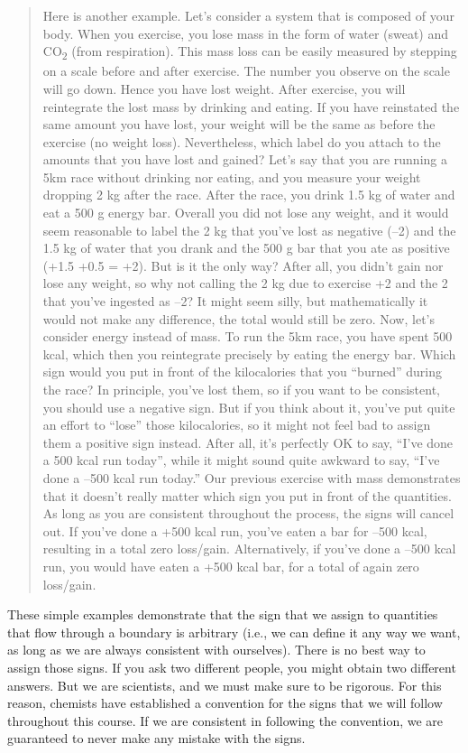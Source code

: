\documentclass[
]{book}
\theoremstyle{definition}
\theoremstyle{definition}
\theoremstyle{definition}
\theoremstyle{remark}
\begin{document}
\begin{quote}
Here is another example. Let's consider a system that is composed of your body. When you exercise, you lose mass in the form of water (sweat) and CO\textsubscript{2} (from respiration). This mass loss can be easily measured by stepping on a scale before and after exercise. The number you observe on the scale will go down. Hence you have lost weight. After exercise, you will reintegrate the lost mass by drinking and eating. If you have reinstated the same amount you have lost, your weight will be the same as before the exercise (no weight loss). Nevertheless, which label do you attach to the amounts that you have lost and gained? Let's say that you are running a 5km race without drinking nor eating, and you measure your weight dropping 2 kg after the race. After the race, you drink 1.5 kg of water and eat a 500 g energy bar. Overall you did not lose any weight, and it would seem reasonable to label the 2 kg that you've lost as negative (--2) and the 1.5 kg of water that you drank and the 500 g bar that you ate as positive (+1.5 +0.5 = +2). But is it the only way? After all, you didn't gain nor lose any weight, so why not calling the 2 kg due to exercise +2 and the 2 that you've ingested as --2? It might seem silly, but mathematically it would not make any difference, the total would still be zero. Now, let's consider energy instead of mass. To run the 5km race, you have spent 500 kcal, which then you reintegrate precisely by eating the energy bar. Which sign would you put in front of the kilocalories that you ``burned'' during the race? In principle, you've lost them, so if you want to be consistent, you should use a negative sign. But if you think about it, you've put quite an effort to ``lose'' those kilocalories, so it might not feel bad to assign them a positive sign instead. After all, it's perfectly OK to say, ``I've done a 500 kcal run today'', while it might sound quite awkward to say, ``I've done a --500 kcal run today.'' Our previous exercise with mass demonstrates that it doesn't really matter which sign you put in front of the quantities. As long as you are consistent throughout the process, the signs will cancel out. If you've done a +500 kcal run, you've eaten a bar for --500 kcal, resulting in a total zero loss/gain. Alternatively, if you've done a --500 kcal run, you would have eaten a +500 kcal bar, for a total of again zero loss/gain.
\end{quote}

These simple examples demonstrate that the sign that we assign to quantities that flow through a boundary is arbitrary (i.e., we can define it any way we want, as long as we are always consistent with ourselves). There is no best way to assign those signs. If you ask two different people, you might obtain two different answers. But we are scientists, and we must make sure to be rigorous. For this reason, chemists have established a convention for the signs that we will follow throughout this course. If we are consistent in following the convention, we are guaranteed to never make any mistake with the signs.
\end{document}
